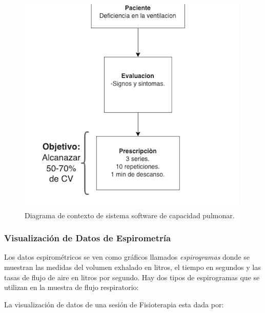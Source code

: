 \documentclass[12pt]{article}
\begin{document}
\begin{figure}[ht]
\centering
\includegraphics[scale=0.45]{imag/prescripcion.png}
\caption{Diagrama de contexto de sistema software de capacidad pulmonar. }
\label{4}
\end{figure}
\FloatBarrier






\subsubsection{Visualización de Datos de Espirometría}  %

Los datos espirométricos se ven como gráficos llamados \textit{espirogramas} donde se muestran las medidas del volumen exhalado
en litros, el tiempo en segundos y las tasas de flujo de aire en litros por segundo. Hay dos tipos de espirogramas que se utilizan en la muestra de flujo respiratorio:

La visualización de datos de una sesión de Fisioterapia esta dada por: 
\end{document}
